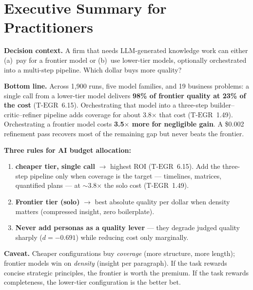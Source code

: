 \documentclass[12pt,a4paper]{article}
\newcommand{\TEGR}{\ensuremath{\text{T-EGR}}}
\begin{document}
\clearpage
\appendix

\section{Executive Summary for Practitioners}\label{sec:exec-summary}

\begin{mdframed}[style=execsummary]
\noindent\textbf{Decision context.} A firm that needs LLM-generated knowledge
work can either (a)~pay for a frontier model or (b)~use lower-tier models,
optionally orchestrated into a multi-step pipeline. Which dollar buys more
quality?

\medskip
\noindent\textbf{Bottom line.} Across 1{,}900 runs, five model families, and 19
business problems: a single call from a lower-tier model delivers
\textbf{98\% of frontier quality at 23\% of the cost} ($\TEGR$~6.15).
Orchestrating that model into a three-step builder--critic--refiner pipeline
adds coverage for about 3.8$\times$ that cost ($\TEGR$~1.49). Orchestrating a
frontier model costs \textbf{3.5$\times$ more for negligible gain}. A \$0.002
refinement pass recovers most of the remaining gap but never beats the
frontier.

\medskip
\noindent\textbf{Three rules for AI budget allocation:}
\begin{enumerate}[leftmargin=*,nosep]
  \item \textbf{cheaper tier, single call} $\to$ highest ROI
    ($\TEGR$~6.15). Add the three-step pipeline only when coverage is the
    target --- timelines, matrices, quantified plans --- at $\sim$3.8$\times$
    the solo cost ($\TEGR$~1.49).
  \item \textbf{Frontier tier (solo)} $\to$ best absolute quality per dollar
    when density matters (compressed insight, zero boilerplate).
  \item \textbf{Never add personas as a quality lever} --- they degrade judged
    quality sharply ($d = -0.691$) while reducing cost only marginally.
\end{enumerate}

\medskip
\noindent\textbf{Caveat.} Cheaper configurations buy \emph{coverage} (more
structure, more length); frontier models win on \emph{density} (insight per
paragraph). If the task rewards concise strategic principles, the frontier is
worth the premium. If the task rewards completeness, the lower-tier
configuration is the better bet.
\end{mdframed}
\end{document}
